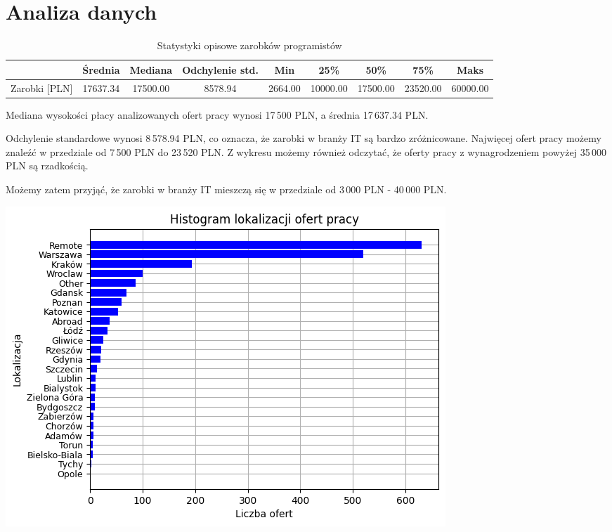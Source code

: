 \documentclass{article}
\begin{document}
\section{Analiza danych}

\begin{table}[h!]
    \centering
    \begin{tabular}{|c|c|c|c|c|c|c|c|c|}
        \hline
                      & Średnia  & Mediana  & Odchylenie std. & Min     & 25\%     & 50\%     & 75\%     & Maks     \\
        \hline
        Zarobki [PLN] & 17637.34 & 17500.00 & 8578.94         & 2664.00 & 10000.00 & 17500.00 & 23520.00 & 60000.00 \\
        \hline
    \end{tabular}
    \caption{Statystyki opisowe zarobków programistów}
    \label{tab:zarobki}
\end{table}

Mediana wysokości płacy analizowanych ofert pracy wynosi 17\,500 PLN, a średnia 17\,637.34 PLN.

Odchylenie standardowe wynosi 8\,578.94 PLN, co oznacza, że zarobki w branży IT są bardzo zróżnicowane.
Najwięcej ofert pracy możemy znaleźć w przedziale od 7\,500 PLN do 23\,520 PLN.
Z wykresu możemy również odczytać, że oferty pracy z wynagrodzeniem powyżej 35\,000 PLN są rzadkością.

Możemy zatem przyjąć, że zarobki w branży IT mieszczą się w przedziale od 3\,000 PLN - 40\,000 PLN.

\begin{center}
    \includegraphics[scale=0.6]{img/location_hist.png}
\end{center}
\end{document}
